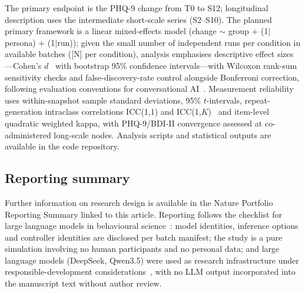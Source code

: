 \documentclass[sn-nature,pdflatex]{sn-jnl}
\begin{document}
The primary endpoint is the PHQ-9 change from T0 to S12; longitudinal description uses the intermediate short-scale series (S2--S10). The planned primary framework is a linear mixed-effects model (change $\sim$ group $+$ (1$|$persona) $+$ (1$|$run)); given the small number of independent runs per condition in available batches ([N] per condition), analysis emphasises descriptive effect sizes---Cohen's $d$~\cite{cohen1988} with bootstrap 95\% confidence intervals---with Wilcoxon rank-sum sensitivity checks and false-discovery-rate control alongside Bonferroni correction, following evaluation conventions for conversational AI~\cite{tu2025}. Measurement reliability uses within-snapshot sample standard deviations, 95\% $t$-intervals, repeat-generation intraclass correlations ICC(1,1) and ICC(1,$K$)~\cite{shrout1979} and item-level quadratic weighted kappa, with PHQ-9/BDI-II convergence assessed at co-administered long-scale nodes. Analysis scripts and statistical outputs are available in the code repository.

\subsection*{Reporting summary}

Further information on research design is available in the Nature Portfolio Reporting Summary linked to this article. Reporting follows the checklist for large language models in behavioural science~\cite{feuerriegel2026}: model identities, inference options and controller identities are disclosed per batch manifest; the study is a pure simulation involving no human participants and no personal data; and large language models (DeepSeek, Qwen3.5) were used as research infrastructure under responsible-development considerations~\cite{stade2024}, with no LLM output incorporated into the manuscript text without author review.

\end{document}
